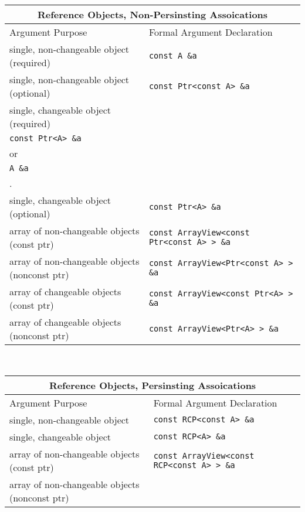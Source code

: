 \begin{table}[p]
%
\begin{center}
%
\begin{tabular}{|l|l|}
%
\multicolumn{2}{c}{\textbf{Reference Objects, Non-Persinsting Assoications}} \\
%
\hline
Argument Purpose
& Formal Argument Declaration \\
\hline
\hline
single, non-changeable object (required)
& {}\texttt{const A \&a} \\
\hline
single, non-changeable object (optional)
& {}\texttt{const Ptr<const A> \&a} \\
\hline
single, changeable object (required)
& \begin{minipage}{20ex}
    {\tiny .}\\
    {}\texttt{const Ptr<A> \&a} \\
    or \\
    {}\texttt{A \&a} \\
    {\tiny .}
  \end{minipage} \\
\hline
single, changeable object (optional)
& \texttt{const Ptr<A> \&a} \\
\hline
array of non-changeable objects (const ptr)
& {}\texttt{const ArrayView<const Ptr<const A> > \&a} \\
\hline
array of non-changeable objects (nonconst ptr)
& {}\texttt{const ArrayView<Ptr<const A> > \&a} \\
\hline
array of changeable objects (const ptr)
& {}\texttt{const ArrayView<const Ptr<A> > \&a} \\
\hline
array of changeable objects (nonconst ptr)
& {}\texttt{const ArrayView<Ptr<A> > \&a} \\
\hline
\end{tabular} \\[3ex]
%
\begin{tabular}{|l|l|}
%
\multicolumn{2}{c}{\textbf{Reference Objects, Persinsting Assoications}} \\
%
\hline
Argument Purpose
& Formal Argument Declaration \\
\hline
\hline
single, non-changeable object
& {}\texttt{const RCP<const A> \&a} \\
\hline
single, changeable object
& {}\texttt{const RCP<A> \&a} \\
\hline
array of non-changeable objects (const ptr)
& {}\texttt{const ArrayView<const RCP<const A> > \&a} \\
\hline
array of non-changeable objects (nonconst ptr)

\end{tabular}
\end{center}
\end{table}
